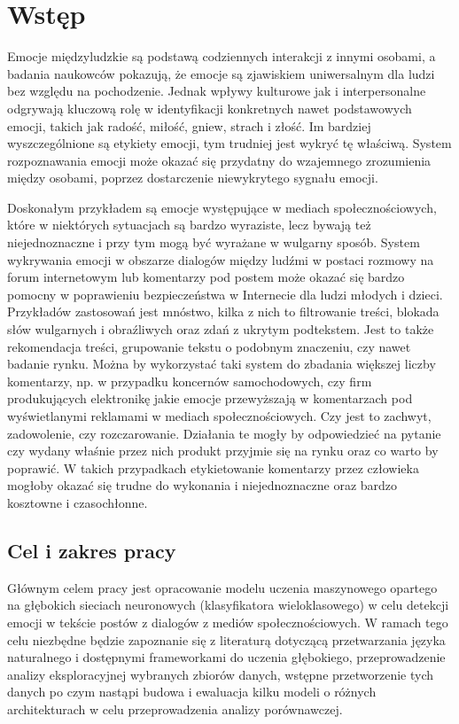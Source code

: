 \chapter{Wstęp}

Emocje międzyludzkie są podstawą codziennych interakcji z innymi osobami, a badania naukowców pokazują, że emocje są zjawiskiem uniwersalnym dla ludzi bez względu na pochodzenie. Jednak wpływy kulturowe jak i interpersonalne odgrywają kluczową rolę w identyfikacji konkretnych nawet podstawowych emocji, takich jak radość, miłość, gniew, strach i złość. Im bardziej wyszczególnione są etykiety emocji, tym trudniej jest wykryć tę właściwą. System rozpoznawania emocji może okazać się przydatny do wzajemnego zrozumienia między osobami, poprzez dostarczenie niewykrytego sygnału emocji. 

Doskonałym przykładem są emocje występujące w mediach społecznościowych, które w niektórych sytuacjach są bardzo wyraziste, lecz bywają też niejednoznaczne i przy tym mogą być wyrażane w wulgarny sposób. System wykrywania emocji w obszarze dialogów między ludźmi w postaci rozmowy na forum internetowym lub komentarzy pod postem może okazać się bardzo pomocny w poprawieniu bezpieczeństwa w Internecie dla ludzi młodych i dzieci. Przykładów zastosowań jest mnóstwo, kilka z nich to filtrowanie treści, blokada słów wulgarnych i obraźliwych oraz zdań z ukrytym podtekstem. Jest to także rekomendacja treści, grupowanie tekstu o podobnym znaczeniu, czy nawet badanie rynku. Można by wykorzystać taki system do zbadania większej liczby komentarzy, np. w przypadku koncernów samochodowych, czy firm produkujących elektronikę jakie emocje przewyższają w komentarzach pod wyświetlanymi reklamami w mediach społecznościowych. Czy jest to zachwyt, zadowolenie, czy rozczarowanie. Działania te mogły by odpowiedzieć na pytanie czy wydany właśnie przez nich produkt przyjmie się na rynku oraz co warto by poprawić. W takich przypadkach etykietowanie komentarzy przez człowieka mogłoby okazać się trudne do wykonania i niejednoznaczne oraz bardzo kosztowne i czasochłonne.

\section{Cel i zakres pracy}

Głównym celem pracy jest opracowanie modelu uczenia maszynowego opartego na głębokich sieciach neuronowych (klasyfikatora wieloklasowego) w celu detekcji emocji w tekście postów z dialogów z mediów społecznościowych. W ramach tego celu niezbędne będzie zapoznanie się z literaturą dotyczącą przetwarzania języka naturalnego i dostępnymi frameworkami do uczenia głębokiego, przeprowadzenie analizy eksploracyjnej wybranych zbiorów danych, wstępne przetworzenie tych danych po czym nastąpi budowa i ewaluacja kilku modeli o różnych architekturach w celu przeprowadzenia analizy porównawczej.

